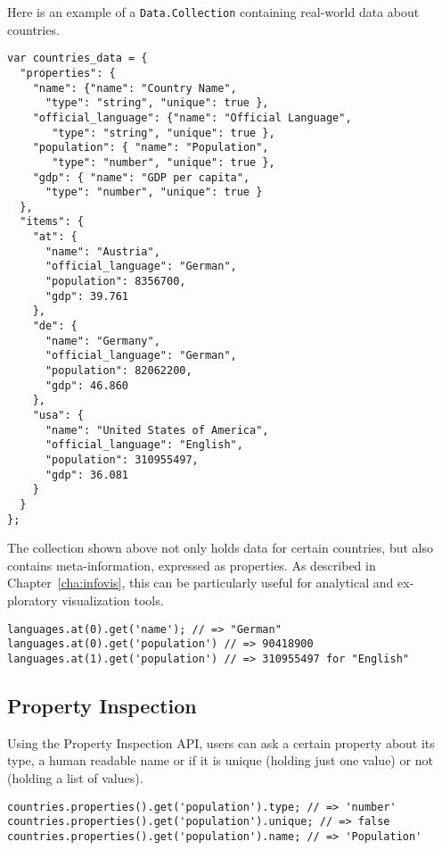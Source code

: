 \begin{english}
Here is an example of a \texttt{Data.Collection} containing real-world data about countries.

\begin{verbatim}
var countries_data = {
  "properties": {
    "name": {"name": "Country Name",
      "type": "string", "unique": true },
    "official_language": {"name": "Official Language",
       "type": "string", "unique": true },
    "population": { "name": "Population",
       "type": "number", "unique": true },
    "gdp": { "name": "GDP per capita",
      "type": "number", "unique": true }
  },
  "items": {
    "at": {
      "name": "Austria",
      "official_language": "German",
      "population": 8356700,
      "gdp": 39.761
    },
    "de": {
      "name": "Germany",
      "official_language": "German",
      "population": 82062200,
      "gdp": 46.860
    },
    "usa": {
      "name": "United States of America",
      "official_language": "English",
      "population": 310955497,
      "gdp": 36.081
    }
  }
};
\end{verbatim}

\SuperPar The collection shown above not only holds data for certain countries, but also contains meta-information, expressed as properties. As described in Chapter~\ref{cha:infovis}, this can be particularly useful for analytical and exploratory visualization tools. 

\begin{verbatim}
languages.at(0).get('name'); // => "German"
languages.at(0).get('population') // => 90418900
languages.at(1).get('population') // => 310955497 for "English"
\end{verbatim}

\subsection{Property Inspection}

Using the Property Inspection API, users can ask a certain property about its type, a human readable name or if it is unique (holding just one value) or not (holding a list of values).

\begin{verbatim}
countries.properties().get('population').type; // => 'number'
countries.properties().get('population').unique; // => false
countries.properties().get('population').name; // => 'Population'
\end{verbatim}


\end{english}

